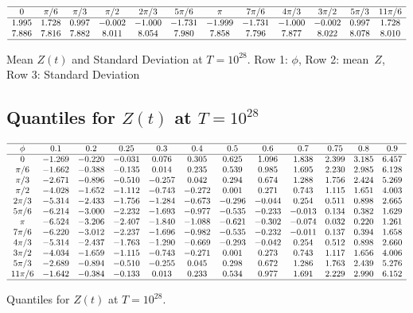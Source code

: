 \documentclass[twoside]{article}
\begin{document}
\begin{table}
\centering \(\begin{array}{cccccccccccc}

\hline
0&\pi/6 &\pi/3 &\pi/2 &2\pi/3 &5\pi/6 &\pi &7\pi/6 &4\pi/3 &3\pi/2 &5\pi/3 &11\pi/6 \\
\hline
1.995&1.728&0.997&-0.002&-1.000&-1.731&-1.999&-1.731&-1.000&-0.002&0.997&1.728 \\
7.886&7.816&7.882&8.011&8.054&7.980&7.858&7.796&7.877&8.022&8.078&8.010 \\
\hline
\end{array}\)
\caption{Mean    $Z(t)$ and Standard Deviation at $T=10^{28}$. Row 1: $\phi$, Row 2: mean~$Z$, Row 3: Standard Deviation}
\label{tab:mean28}
\end{table}


\subsection{\label{E28}Quantiles for $Z(t)$ at $T=10^{28}$}

\begin{table}
\centering \(\begin{array}{cccccccccccc}
\hline
\phi&0.1&0.2&0.25&0.3&0.4&0.5&0.6&0.7&0.75&0.8&0.9 \\
\hline
0&-1.269&-0.220&-0.031&0.076&0.305&0.625&1.096&1.838&2.399&3.185&6.457\\
\pi/6 &-1.662&-0.388&-0.135&0.014&0.235&0.539&0.985&1.695&2.230&2.985&6.128\\
\pi/3 &-2.671&-0.896&-0.510&-0.257&0.042&0.294&0.674&1.288&1.756&2.424&5.269\\
\pi/2 &-4.028&-1.652&-1.112&-0.743&-0.272&0.001&0.271&0.743&1.115&1.651&4.003\\
2\pi/3 &-5.314&-2.433&-1.756&-1.284&-0.673&-0.296&-0.044&0.254&0.511&0.898&2.665\\
5\pi/6 &-6.214&-3.000&-2.232&-1.693&-0.977&-0.535&-0.233&-0.013&0.134&0.382&1.629\\
\pi &-6.524&-3.206&-2.407&-1.840&-1.088&-0.621&-0.302&-0.074&0.032&0.220&1.261\\
7\pi/6 &-6.220&-3.012&-2.237&-1.696&-0.982&-0.535&-0.232&-0.011&0.137&0.394&1.658\\
4\pi/3 &-5.314&-2.437&-1.763&-1.290&-0.669&-0.293&-0.042&0.254&0.512&0.898&2.660\\
3\pi/2 &-4.034&-1.659&-1.115&-0.743&-0.271&0.001&0.273&0.743&1.117&1.656&4.006\\
5\pi/3 &-2.689&-0.894&-0.510&-0.255&0.045&0.298&0.672&1.286&1.763&2.439&5.276\\
11\pi/6 &-1.642&-0.384&-0.133&0.013&0.233&0.534&0.977&1.691&2.229&2.990&6.152\\
\hline
\end{array}\)
\caption{Quantiles  for  $Z(t)$ at $T=10^{28}$.}
\label{tab:quantiles28}
\end{table}
\end{document}
